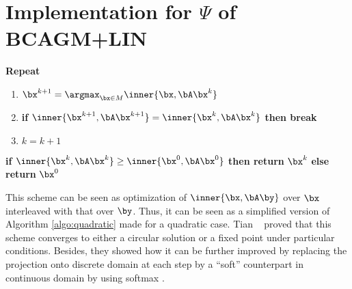 \chapter{Implementation for $\Psi$ of BCAGM+LIN}
\label{chap:appendix}
\begin{algorithm}
    \caption{$\Psi(\bA, \bx^0)$} 
    \textbf{Repeat} 
    \begin{enumerate}
	\item $\bx^{k+1} = \displaystyle\argmax_{\bx \in M} \inner{\bx, \bA\bx^k}$ 
	\item \textbf{if} $\inner{\bx^{k+1}, \bA\bx^{k+1}} = \inner{\bx^k, \bA\bx^k}$ \textbf{then break}
	\item $k = k + 1$
    \end{enumerate}
    \textbf{if } $\inner{\bx^k, \bA\bx^k} \geq \inner{\bx^0, \bA\bx^0}$ \textbf{then return } $\bx^k$
    \textbf{else return } $\bx^0$
\end{algorithm}
This scheme can be seen as optimization of $\inner{\bx, \bA\by}$ over $\bx$ interleaved with that over $\by$.
Thus, it can be seen as a simplified version of Algorithm \ref{algo:quadratic} made for a quadratic case.
Tian \etal ~\cite{Tian2012} proved that this scheme converges to either a circular solution or a fixed point under particular conditions.
Besides, they showed how it can be further improved by replacing the projection onto discrete domain at each step
by a ``soft'' counterpart in continuous domain by using softmax \cite{Gold1996}.

\clearpage
\newpage
